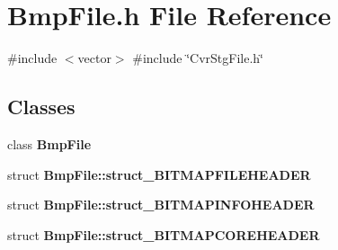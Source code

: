 \section{Bmp\+File.\+h File Reference}
\label{BmpFile_8h}
{\ttfamily \#include $<$vector$>$}\newline
{\ttfamily \#include \char`\"{}Cvr\+Stg\+File.\+h\char`\"{}}\newline
\subsection*{Classes}
\begin{DoxyCompactItemize}
\item 
class \textbf{ Bmp\+File}
\item 
struct \textbf{ Bmp\+File\+::struct\+\_\+\+B\+I\+T\+M\+A\+P\+F\+I\+L\+E\+H\+E\+A\+D\+ER}
\item 
struct \textbf{ Bmp\+File\+::struct\+\_\+\+B\+I\+T\+M\+A\+P\+I\+N\+F\+O\+H\+E\+A\+D\+ER}
\item 
struct \textbf{ Bmp\+File\+::struct\+\_\+\+B\+I\+T\+M\+A\+P\+C\+O\+R\+E\+H\+E\+A\+D\+ER}
\end{DoxyCompactItemize}
